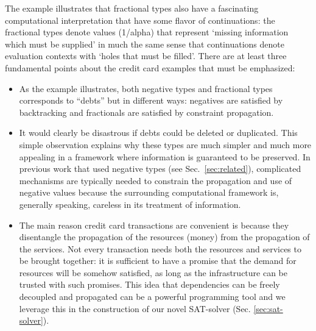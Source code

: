 \documentclass[preprint]{sigplanconf}
\begin{document}

The example illustrates that fractional types also have a fascinating
computational interpretation that have some flavor of continuations:
the fractional types denote values ({{1/alpha}}) that represent
`missing information which must be supplied' in much the same sense
that continuations denote evaluation contexts with `holes that must be
filled'.  There are at least three fundamental points about the credit
card examples that must be emphasized:

\begin{itemize}
\item 
As the example illustrates, both negative types and fractional types
corresponds to ``debts'' but in different ways: negatives are satisfied
by backtracking and fractionals are satisfied by constraint
propagation.

\item 
It would clearly be disastrous if debts could be deleted or
duplicated. This simple observation explains why these types are much
simpler and much more appealing in a framework where information is
guaranteed to be preserved. In previous work that used negative types
(see Sec.~\ref{sec:related}), complicated mechanisms are typically
needed to constrain the propagation and use of negative values because
the surrounding computational framework is, generally speaking,
careless in its treatment of information.

\item 
The main reason credit card transactions are convenient is because
they disentangle the propagation of the resources (money) from the
propagation of the services. Not every transaction needs both the
resources and services to be brought together: it is sufficient to
have a promise that the demand for resources will be somehow
satisfied, as long as the infrastructure can be trusted with such
promises. This idea that dependencies can be freely decoupled and
propagated can be a powerful programming tool and we leverage this in
the construction of our novel SAT-solver (Sec. \ref{sec:sat-solver}).


\end{itemize}
\end{document}
